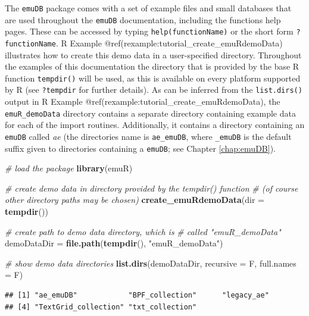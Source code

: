 \documentclass[]{book}
\newenvironment{Shaded}{\begin{snugshade}}{\end{snugshade}}
\newcommand{\KeywordTok}[1]{\textcolor[rgb]{0.13,0.29,0.53}{\textbf{{#1}}}}
\newcommand{\DataTypeTok}[1]{\textcolor[rgb]{0.13,0.29,0.53}{{#1}}}
\newcommand{\StringTok}[1]{\textcolor[rgb]{0.31,0.60,0.02}{{#1}}}
\newcommand{\CommentTok}[1]{\textcolor[rgb]{0.56,0.35,0.01}{\textit{{#1}}}}
\newcommand{\NormalTok}[1]{{#1}}
\theoremstyle{definition}
\theoremstyle{definition}
\theoremstyle{definition}
\theoremstyle{remark}
\begin{document}
The \texttt{emuDB} package comes with a set of example files and small
databases that are used throughout the \texttt{emuDB} documentation,
including the functions help pages. These can be accessed by typing
\texttt{help(functionName)} or the short form \texttt{?functionName}. R
Example @ref(rexample:tutorial\_create\_emuRdemoData) illustrates how to
create this demo data in a user-specified directory. Throughout the
examples of this documentation the directory that is provided by the
base R function \texttt{tempdir()} will be used, as this is available on
every platform supported by R (see \texttt{?tempdir} for further
details). As can be inferred from the \texttt{list.dirs()} output in R
Example @ref(rexample:tutorial\_create\_emuRdemoData), the
\texttt{emuR\_demoData} directory contains a separate directory
containing example data for each of the import routines. Additionally,
it contains a directory containing an \texttt{emuDB} called \emph{ae}
(the directories name is \texttt{ae\_emuDB}, where \texttt{\_emuDB} is
the default suffix given to directories containing a \texttt{emuDB}; see
Chapter \ref{chap:emuDB}).

\begin{Shaded}
\begin{Highlighting}[]
\CommentTok{# load the package}
\KeywordTok{library}\NormalTok{(emuR)}

\CommentTok{# create demo data in directory provided by the tempdir() function}
\CommentTok{# (of course other directory paths may be chosen)}
\KeywordTok{create_emuRdemoData}\NormalTok{(}\DataTypeTok{dir =} \KeywordTok{tempdir}\NormalTok{())}

\CommentTok{# create path to demo data directory, which is}
\CommentTok{# called "emuR_demoData"}
\NormalTok{demoDataDir =}\StringTok{ }\KeywordTok{file.path}\NormalTok{(}\KeywordTok{tempdir}\NormalTok{(), }\StringTok{"emuR_demoData"}\NormalTok{)}

\CommentTok{# show demo data directories}
\KeywordTok{list.dirs}\NormalTok{(demoDataDir, }\DataTypeTok{recursive =} \NormalTok{F, }\DataTypeTok{full.names =} \NormalTok{F)}
\end{Highlighting}
\end{Shaded}

\begin{verbatim}
## [1] "ae_emuDB"            "BPF_collection"      "legacy_ae"          
## [4] "TextGrid_collection" "txt_collection"
\end{verbatim}
\end{document}
